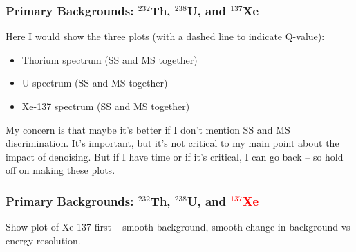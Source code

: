 \documentclass{beamer}
\begin{document}
\begin{frame}
\begin{center}
\frametitle{Primary Backgrounds: $^{232}$Th, $^{238}$U, and $^{137}$Xe}
\end{center}
Here I would show the three plots (with a dashed line to indicate Q-value):
\begin{itemize}
\item Thorium spectrum (SS and MS together)
\item U spectrum (SS and MS together)
\item Xe-137 spectrum (SS and MS together)
\end{itemize}
My concern is that maybe it's better if I don't mention SS and MS discrimination.  It's important, but it's not critical to my main point about the impact of denoising.  But if I have time or if it's critical, I can go back -- so hold off on making these plots.
\end{frame}

\begin{frame}
\begin{center}
\frametitle{Primary Backgrounds: $^{232}$Th, $^{238}$U, and \textcolor{red}{$^{137}$Xe}}
\end{center}
Show plot of Xe-137 first -- smooth background, smooth change in background vs energy resolution.
\end{frame}
\end{document}

